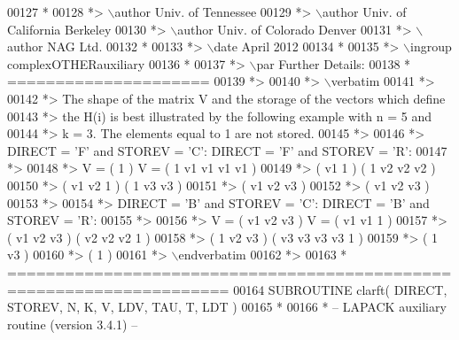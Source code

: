 \begin{DoxyCode}
00127 \textcolor{comment}{*}
00128 \textcolor{comment}{*> \(\backslash\)author Univ. of Tennessee }
00129 \textcolor{comment}{*> \(\backslash\)author Univ. of California Berkeley }
00130 \textcolor{comment}{*> \(\backslash\)author Univ. of Colorado Denver }
00131 \textcolor{comment}{*> \(\backslash\)author NAG Ltd. }
00132 \textcolor{comment}{*}
00133 \textcolor{comment}{*> \(\backslash\)date April 2012}
00134 \textcolor{comment}{*}
00135 \textcolor{comment}{*> \(\backslash\)ingroup complexOTHERauxiliary}
00136 \textcolor{comment}{*}
00137 \textcolor{comment}{*> \(\backslash\)par Further Details:}
00138 \textcolor{comment}{*  =====================}
00139 \textcolor{comment}{*>}
00140 \textcolor{comment}{*> \(\backslash\)verbatim}
00141 \textcolor{comment}{*>}
00142 \textcolor{comment}{*>  The shape of the matrix V and the storage of the vectors which define}
00143 \textcolor{comment}{*>  the H(i) is best illustrated by the following example with n = 5 and}
00144 \textcolor{comment}{*>  k = 3. The elements equal to 1 are not stored.}
00145 \textcolor{comment}{*>}
00146 \textcolor{comment}{*>  DIRECT = 'F' and STOREV = 'C':         DIRECT = 'F' and STOREV = 'R':}
00147 \textcolor{comment}{*>}
00148 \textcolor{comment}{*>               V = (  1       )                 V = (  1 v1 v1 v1 v1 )}
00149 \textcolor{comment}{*>                   ( v1  1    )                     (     1 v2 v2 v2 )}
00150 \textcolor{comment}{*>                   ( v1 v2  1 )                     (        1 v3 v3 )}
00151 \textcolor{comment}{*>                   ( v1 v2 v3 )}
00152 \textcolor{comment}{*>                   ( v1 v2 v3 )}
00153 \textcolor{comment}{*>}
00154 \textcolor{comment}{*>  DIRECT = 'B' and STOREV = 'C':         DIRECT = 'B' and STOREV = 'R':}
00155 \textcolor{comment}{*>}
00156 \textcolor{comment}{*>               V = ( v1 v2 v3 )                 V = ( v1 v1  1       )}
00157 \textcolor{comment}{*>                   ( v1 v2 v3 )                     ( v2 v2 v2  1    )}
00158 \textcolor{comment}{*>                   (  1 v2 v3 )                     ( v3 v3 v3 v3  1 )}
00159 \textcolor{comment}{*>                   (     1 v3 )}
00160 \textcolor{comment}{*>                   (        1 )}
00161 \textcolor{comment}{*> \(\backslash\)endverbatim}
00162 \textcolor{comment}{*>}
00163 \textcolor{comment}{*  =====================================================================}
00164 \textcolor{keyword}{      SUBROUTINE }clarft( DIRECT, STOREV, N, K, V, LDV, TAU, T, LDT )
00165 \textcolor{comment}{*}
00166 \textcolor{comment}{*  -- LAPACK auxiliary routine (version 3.4.1) --}

\end{DoxyCode}
